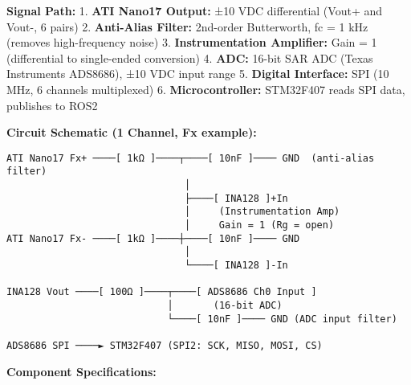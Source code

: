 \documentclass[
]{article}
\begin{document}
\textbf{Signal Path:} 1. \textbf{ATI Nano17 Output:} ±10 VDC
differential (Vout+ and Vout-, 6 pairs) 2. \textbf{Anti-Alias Filter:}
2nd-order Butterworth, fc = 1 kHz (removes high-frequency noise) 3.
\textbf{Instrumentation Amplifier:} Gain = 1 (differential to
single-ended conversion) 4. \textbf{ADC:} 16-bit SAR ADC (Texas
Instruments ADS8686), ±10 VDC input range 5. \textbf{Digital Interface:}
SPI (10 MHz, 6 channels multiplexed) 6. \textbf{Microcontroller:}
STM32F407 reads SPI data, publishes to ROS2

\textbf{Circuit Schematic (1 Channel, Fx example):}

\begin{verbatim}
ATI Nano17 Fx+ ────[ 1kΩ ]────┬────[ 10nF ]──── GND  (anti-alias filter)
                               │
                               ├────[ INA128 ]+In
                               │     (Instrumentation Amp)
                               │     Gain = 1 (Rg = open)
ATI Nano17 Fx- ────[ 1kΩ ]────┼────[ 10nF ]──── GND
                               │
                               └────[ INA128 ]-In

INA128 Vout ────[ 100Ω ]────┬────[ ADS8686 Ch0 Input ]
                            │       (16-bit ADC)
                            └────[ 10nF ]──── GND (ADC input filter)

ADS8686 SPI ────► STM32F407 (SPI2: SCK, MISO, MOSI, CS)
\end{verbatim}

\textbf{Component Specifications:}
\end{document}
